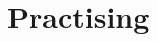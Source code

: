 \documentclass[compress,11pt,xcolor=svgnames,aspectratio=169]{beamer}
\begin{document}

\section{Practising}
\end{document}
